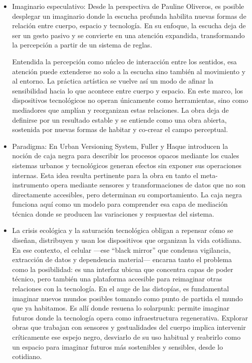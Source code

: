 \documentclass[spanish]{report}
\begin{document}
\begin{itemize}
    \item Imaginario especulativo: 
    Desde la perspectiva de Pauline Oliveros, es posible desplegar un imaginario donde la escucha profunda habilita nuevas formas de relación entre cuerpo, espacio y tecnología. En su enfoque, la escucha deja de ser un gesto pasivo y se convierte en una atención expandida, transformando la percepción a partir de un sistema de reglas.

    Entendida la percepción como núcleo de interacción entre los sentidos, esa atención puede extenderse no solo a la escucha sino también al movimiento y al entorno. La práctica artística se vuelve así un modo de afinar la sensibilidad hacia lo que acontece entre cuerpo y espacio. En este marco, los dispositivos tecnológicos no operan únicamente como herramientas, sino como mediadores que amplían y reorganizan estas relaciones. La obra deja de definirse por un resultado estable y se entiende como una obra abierta, sostenida por nuevas formas de habitar y co-crear el campo perceptual.


    \item Paradigma: 
    En Urban Versioning System, Fuller y Haque introducen la noción de caja negra para describir los procesos opacos mediante los cuales sistemas urbanos y tecnológicos generan efectos sin exponer sus operaciones internas. Esta idea resulta pertinente para la obra en tanto el meta-instrumento opera mediante sensores y transformaciones de datos que no son directamente accesibles, pero determinan su comportamiento. La caja negra funciona aquí como un modelo para comprender esa capa de mediación técnica donde se producen las variaciones y respuestas del sistema.
    
    \item La crisis ecológica y la saturación tecnológica obligan a repensar cómo se diseñan, distribuyen y usan los dispositivos que organizan la vida cotidiana. En ese contexto, el celular —ese “black mirror” que condensa vigilancia, extracción de datos y dependencia material— encarna tanto el problema como la posibilidad: es una interfaz ubicua que concentra capas de poder técnico, pero también una plataforma accesible para reimaginar otras relaciones con la tecnología. En el auge de las distopías, es fundamental imaginar nuevos mundos posibles tomando como punto de partida el mundo que ya habitamos. Es allí donde resuena lo solarpunk: permite imaginar futuros donde la tecnología opera como infraestructura regenerativa.
    Explorar obras que trabajan con sensores y gestualidades del cuerpo implica intervenir críticamente ese espejo negro, desviarlo de su uso habitual y reabrirlo como un espacio para imaginar futuros más sostenibles y sensibles, desde lo cotidiano.

\end{itemize}
\end{document}
